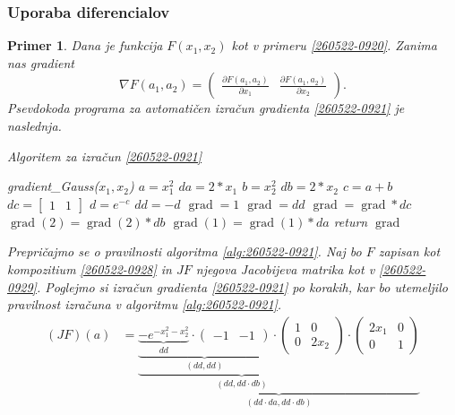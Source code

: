 \documentclass[12pt,slovene]{article}
\DeclareMathOperator{\grad}{grad}
\newtheorem{primer}{Primer}
\begin{document}
\subsubsection{Uporaba diferencialov}

\begin{primer}
Dana je funkcija $F(x_1,x_2)$
kot v primeru \eqref{260522-0920}.
Zanima nas gradient
\begin{equation}\label{260522-0921}
\nabla F(a_1,a_2)=
\begin{pmatrix}
\frac{\partial F(a_1,a_2)}{\partial x_1} &
\frac{\partial F(a_1,a_2)}{\partial x_2}
\end{pmatrix}.
\end{equation}
Psevdokoda programa za avtomatičen izračun
gradienta \eqref{260522-0921} je naslednja.

\begin{algorithm}[H]
\caption{Algoritem za izračun \eqref{260522-0921} }\label{alg:260522-0921}
\begin{algorithmic}\State
gradient\_Gauss($x_1,x_2$)
\State\quad $a=x_1^2$
\State\quad $da=2*x_1$
\State\quad $b=x_2^2$
\State\quad $db=2*x_2$
\State\quad $c=a+b$
\State\quad $dc=\left[\begin{array}{cc} 1 & 1\end{array}\right]$
\State\quad $d=e^{-c}$
\State\quad $dd=-d$
\State\quad $\grad=1$
\State\quad $\grad=dd$
\State\quad $\grad=\grad*dc$
\State\quad $\grad(2)=\grad(2)*db$
\State\quad $\grad(1)=\grad(1)*da$
\State return $\grad$
\end{algorithmic}
\end{algorithm}
Prepričajmo se o pravilnosti algoritma
\eqref{alg:260522-0921}.
Naj bo $F$ zapisan kot kompozitium
\eqref{260522-0928} in 
$JF$ njegova Jacobijeva matrika kot v \eqref{260522-0929}.
Poglejmo si izračun gradienta \eqref{260522-0921} po korakih, kar bo utemeljilo pravilnost izračuna v algoritmu 
\ref{alg:260522-0921}.
\begin{align*}
(JF)(a)
&=
\underbrace{\underbrace{\underbrace{\underbrace{-e^{-x_1^2-x_2^2}}_{dd}\cdot
\begin{pmatrix}
-1 & -1
\end{pmatrix}}_{(dd,dd)}
\cdot 
\begin{pmatrix}
1 & 0\\
0 & 2x_2
\end{pmatrix}}_{(dd,dd\cdot db)}\cdot
\begin{pmatrix}
2x_1 & 0\\
0 & 1
\end{pmatrix}}_{(dd\cdot da,dd\cdot db)}
\end{align*}
\end{primer}
\end{document}
